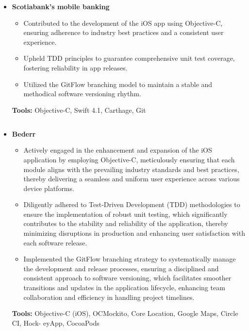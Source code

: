 \documentclass[11pt,a4paper,english]{moderncv}
\begin{document}
{\begin{itemize}
\begin{itemize}
            \item Augmented performance by offloading computationally intensive tasks to Celery jobs, optimizing asynchronous operations.
            \item Engineered an automated content moderation system using AWS Rekognition and Azure Cognitive Services that upheld content quality and compliance.
        \end{itemize}
        \textbf{Tools:} Python, asyncio, Flask, SQLAlchemy, MySQL, MongoDB, Mock, Git, Docker
    \item \textbf{Scotiabank's mobile banking}
        \begin{itemize}
            \item Contributed to the development of the iOS app using Objective-C, ensuring adherence to industry best practices and a consistent user experience.
            \item Upheld TDD principles to guarantee comprehensive unit test coverage, fostering reliability in app releases.
            \item Utilized the GitFlow branching model to maintain a stable and methodical software versioning rhythm.
        \end{itemize}
        \textbf{Tools:} Objective-C, Swift 4.1, Carthage, Git
\end{itemize}
}

\subsection{}

{
\begin{itemize}
    \item \textbf{Bederr}
        \begin{itemize}
            \item Actively engaged in the enhancement and expansion of the iOS application by employing Objective-C, meticulously ensuring that each module aligns with the prevailing industry standards and best practices, thereby delivering a seamless and uniform user experience across various device platforms.
            \item Diligently adhered to Test-Driven Development (TDD) methodologies to ensure the implementation of robust unit testing, which significantly contributes to the stability and reliability of the application, thereby minimizing disruptions in production and enhancing user satisfaction with each software release.
            \item Implemented the GitFlow branching strategy to systematically manage the development and release processes, ensuring a disciplined and consistent approach to software versioning, which facilitates smoother transitions and updates in the application lifecycle, enhancing team collaboration and efficiency in handling project timelines.
        \end{itemize}
        \textbf{Tools:} Objective-C (iOS), OCMockito, Core Location, Google Maps, Circle CI, Hock- eyApp, CocoaPods
\end{itemize}
}
\end{document}
